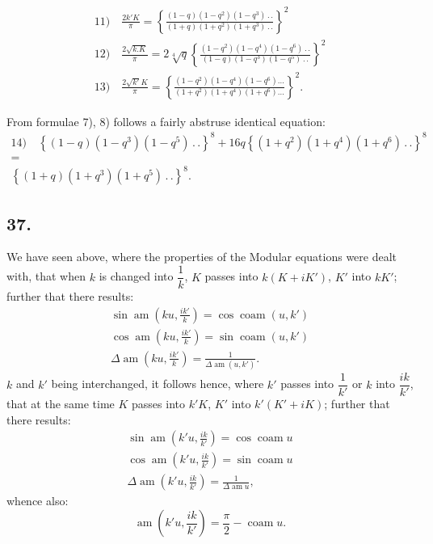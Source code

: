 \documentclass{article}
\begin{document}
\[
\begin{gathered}
\text{11)}\quad\frac{2k'K}{\pi}=\left\{\frac{(1-q)(1-q^{2})(1-q^{3})\,.\,.}{(1+q)(1+q^{2})(1+q^{3})\,.\,.}\right\}^{2}
\\[2ex]
\text{12)}\quad\frac{2\sqrt{k.K}}{\pi}=2\sqrt[4]{q}\left\{\frac{(1-q^{2})(1-q^{4})(1-q^{6})\,.\,.}{(1-q)(1-q^{3})(1-q^{5})\,.\,.}\right\}^{2}
\\[2ex]
\text{13)}\quad\frac{2\sqrt{k'}K}{\pi}=\left\{\frac{(1-q^{2})(1-q^{4})(1-q^{6})\ldots}{(1+q^{2})(1+q^{4})(1+q^{6})\ldots}\right\}^{2}.
\end{gathered}
\]

From formulae 7), 8) follows a fairly abstruse identical equation:
\[
\begin{gathered}
\text{14)}\quad\left\{(1-q)(1-q^{3})(1-q^{5})\,.\,.\right\}^{8}+16q\left\{(1+q^{2})(1+q^{4})(1+q^{6})\,.\,.\right\}^{8}
\\[1ex]
=
\\[1ex]
\left\{(1+q)(1+q^{3})(1+q^{5})\,.\,.\right\}^{8}.
\end{gathered}
\]

\subsection*{37.}

We have seen above, where the properties of the Modular equations were dealt with, that when $k$ is changed into $\dfrac{1}{k}$, $K$ passes into $k(K+iK')$, $K'$ into $kK'$; further that there results:
\[
\begin{gathered}
\sin\operatorname{am}\left(ku,\frac{ik'}{k}\right)=\cos\operatorname{coam}(u,k')
\\[2ex]
\cos\operatorname{am}\left(ku,\frac{ik'}{k}\right)=\sin\operatorname{coam}(u,k')
\\[2ex]
\Delta\operatorname{am}\left(ku,\frac{ik'}{k}\right)=\frac{1}{\Delta\operatorname{am}(u,k')}.
\end{gathered}
\]
$k$ and $k'$ being interchanged, it follows hence, where $k'$ passes into $\dfrac{1}{k'}$ or $k$ into $\dfrac{ik}{k'}$, that at the same time $K$ passes into $k'K$, $K'$ into $k'(K'+iK)$; further that there results:
\[
\begin{gathered}
\sin\operatorname{am}\left(k'u,\frac{ik}{k'}\right)=\cos\operatorname{coam}u
\\[2ex]
\cos\operatorname{am}\left(k'u,\frac{ik}{k'}\right)=\sin\operatorname{coam}u
\\[2ex]
\Delta\operatorname{am}\left(k'u,\frac{ik}{k'}\right)=\frac{1}{\Delta\operatorname{am}u},
\end{gathered}
\]
whence also:
\[
\operatorname{am}\left(k'u,\frac{ik}{k'}\right)=\frac{\pi}{2}-\operatorname{coam}u.
\]
\end{document}
